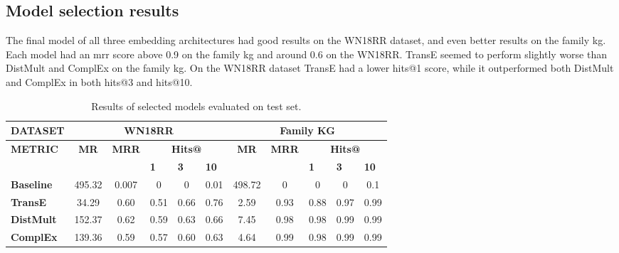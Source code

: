 \subsection{Model selection results}
The final model of all three embedding architectures had good results on the WN18RR dataset, and even better results on the family \gls{kg}. Each model had an \gls{mrr} score above 0.9 on the family \gls{kg} and around 0.6 on the WN18RR. TransE seemed to perform slightly worse than DistMult and ComplEx on the family \gls{kg}. On the WN18RR dataset TransE had a lower hits@1 score, while it outperformed both DistMult and ComplEx in both hits@3 and hits@10.
\begin{table}[htbp]
\centering
\begin{tabular}{l||ccccc||ccccc}

{\textbf{DATASET}}                 & \multicolumn{5}{c||}{\textbf{WN18RR}}                                                                                                                                               & \multicolumn{5}{c}{\textbf{Family KG}}                                                                                                                            \\ \hline
\multirow{2}{*}{{\textbf{METRIC}}} & \multicolumn{1}{c|}{\multirow{2}{*}{\textbf{MR}}} & \multicolumn{1}{c|}{\multirow{2}{*}{\textbf{MRR}}} & \multicolumn{3}{c||}{\textbf{Hits@}}                                       & \multicolumn{1}{c|}{\multirow{2}{*}{\textbf{MR}}} & \multicolumn{1}{c|}{\multirow{2}{*}{\textbf{MRR}}} & \multicolumn{3}{c}{\textbf{Hits@}}                                       \\ \cline{4-6} \cline{9-11} 
                                       & \multicolumn{1}{c|}{}                             & \multicolumn{1}{c|}{}                              & \multicolumn{1}{l|}{\textbf{1}} & \multicolumn{1}{l|}{\textbf{3}} & \multicolumn{1}{l||}{\textbf{10}} & \multicolumn{1}{c|}{}                             & \multicolumn{1}{c|}{}                              & \multicolumn{1}{l|}{\textbf{1}} & \multicolumn{1}{l|}{\textbf{3}} & \multicolumn{1}{l}{\textbf{10}} \\ \hline
\textbf{Baseline}       & 495.32     & 0.007      & 0     & 0       & 0.01        & 498.72       & 0     & 0       & 0       & 0.1      \\ 
\textbf{TransE}  & 34.29  & 0.60       & 0.51                     & 0.66    & 0.76 & 2.59     & 0.93  &0.88  & 0.97   & 0.99   \\ 
\textbf{DistMult}      & 152.37  & 0.62    & 0.59   & 0.63      & 0.66   & 7.45    & 0.98     & 0.98    & 0.99   & 0.99    \\ 
\textbf{ComplEx}        & 139.36    & 0.59      & 0.57      & 0.60      & 0.63      & 4.64     & 0.99     & 0.98     & 0.99      & 0.99  
\end{tabular}
\caption[Test results of selected model.]{Results of selected models evaluated on test set.}
\end{table}


